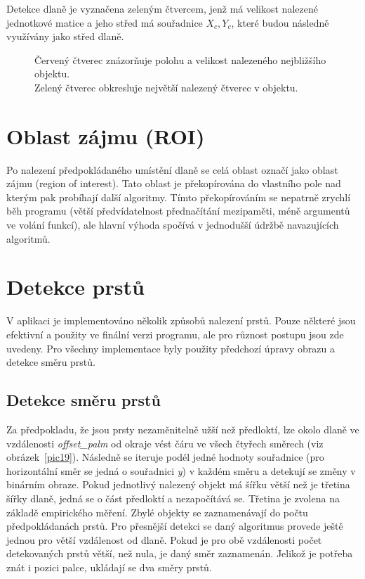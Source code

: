 Detekce dlaně je vyznačena zeleným čtvercem, jenž má velikost nalezené jednotkové matice a jeho střed má souřadnice $ X_{c}, Y_{c} $, které budou následně využívány jako střed dlaně.

\begin{figure}[htp]
\centering
{}
\caption{Červený čtverec znázorňuje polohu a velikost nalezeného nejbližšího objektu.\\
Zelený čtverec obkresluje největší nalezený čtverec v objektu.}
\label{pic18}
\end{figure}

\section{Oblast zájmu (ROI)}
Po nalezení předpokládaného umístění dlaně se celá oblast označí jako oblast zájmu (region of interest). Tato oblast je překopírována do vlastního pole nad kterým pak probíhají další algoritmy. Tímto překopírováním se nepatrně zrychlí běh programu (větší předvídatelnost přednačítání mezipaměti, méně argumentů ve volání funkcí), ale hlavní výhoda spočívá v jednodušší údržbě navazujících algoritmů.

\section{Detekce prstů}
\label{detekce_prstu}
V aplikaci je implementováno několik způsobů nalezení prstů. Pouze některé jsou efektivní a použity ve finální verzi programu, ale pro různost postupu jsou zde uvedeny. Pro všechny implementace byly použity předchozí úpravy obrazu a detekce směru prstů.

\subsection{Detekce směru prstů}
Za předpokladu, že jsou prsty nezaměnitelně užší než předloktí, lze okolo dlaně ve vzdálenosti \textit{offset\_palm} od okraje vést čáru ve všech čtyřech směrech (viz obrázek~\ref{pic19}). Následně se iteruje podél jedné hodnoty souřadnice (pro horizontální směr se jedná o souřadnici \textit{y}) v každém směru a detekují se změny v binárním obraze. Pokud jednotlivý nalezený objekt má šířku větší než je třetina šířky dlaně, jedná se o část předloktí a nezapočítává se. Třetina je zvolena na základě empirického měření. Zbylé objekty se zaznamenávají do počtu předpokládanách prstů.  Pro přesnější detekci se daný algoritmus provede ještě jednou pro větší vzdálenost od dlaně. Pokud je pro obě vzdálenosti počet detekovaných prstů větší, než nula, je daný směr zaznamenán. Jelikož je potřeba znát i pozici palce, ukládají se dva směry prstů.

